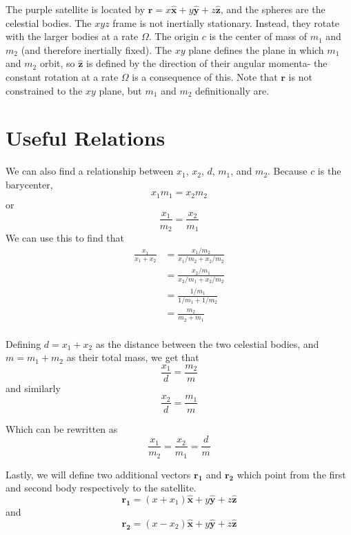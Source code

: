\documentclass{article}
\newcommand{\vv}[1]{\boldsymbol{#1}}
\newcommand{\vh}[1]{\boldsymbol{\hat{#1}}}
\begin{document}
The purple satellite is located by $\vv{r}=x\vh{x}+y\vh{y}+z\vh{z}$, and the spheres are the celestial bodies. The $xyz$ frame is not inertially stationary. Instead, they rotate with the larger bodies at a rate $\Omega$. The origin $c$ is the center of mass of $m_1$ and $m_2$ (and therefore inertially fixed). The $xy$ plane defines the plane in which $m_1$ and $m_2$ orbit, so $\vh{z}$ is defined by the direction of their angular momenta- the constant rotation at a rate $\Omega$ is a consequence of this. Note that $\vv{r}$ is not constrained to the $xy$ plane, but $m_1$ and $m_2$ definitionally are. 

\section*{Useful Relations}

We can also find a relationship between $x_1$, $x_2$, $d$, $m_1$, and $m_2$. Because $c$ is the barycenter,
\[x_1m_1=x_2m_2\]
or
\[\frac{x_1}{m_2}=\frac{x_2}{m_1}\]
We can use this to find that
\[\begin{aligned}
\frac{x_1}{x_1+x_2}&=\frac{x_1/m_2}{x_1/m_2+x_2/m_2}\\
&=\frac{x_2/m_1}{x_2/m_1+x_2/m_2}\\
&=\frac{1/m_1}{1/m_1+1/m_2}\\
&=\frac{m_2}{m_2+m_1}\\
\end{aligned}\]

Defining $d=x_1+x_2$ as the distance between the two celestial bodies, and $m=m_1+m_2$ as their total mass, we get that
\[\boxed{\frac{x_1}{d}=\frac{m_2}{m}}\]
and similarly
\[\boxed{\frac{x_2}{d}=\frac{m_1}{m}}\]


Which can be rewritten as
\[\boxed{\frac{x_1}{m_2}=\frac{x_2}{m_1}=\frac{d}{m}}\]

Lastly, we will define two additional vectors $\vv{r_1}$ and $\vv{r_2}$ which point from the first and second body respectively to the satellite.
\[\vv{r_1}=\left(x+x_1\right)\vh{x}+y\vh{y}+z\vh{z}\]
and
\[\vv{r_2}=\left(x-x_2\right)\vh{x}+y\vh{y}+z\vh{z}\]
\end{document}
